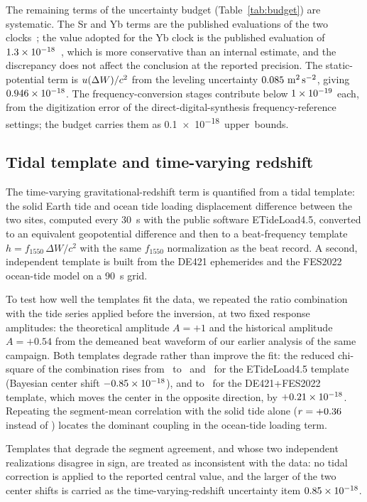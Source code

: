 The remaining terms of the uncertainty budget (Table~\ref{tab:budget})
are systematic. The Sr and Yb terms are the published evaluations of
the two clocks~\citep{jia2026sr, zhu2026yb}; the value adopted for the
Yb clock is the published evaluation of
$1.3\times10^{-18}$~\citep{zhu2026yb}, which is more conservative
than an internal estimate, and the discrepancy does not affect the
conclusion at the reported precision. The static-potential term is
$u(\Delta W)/c^2$ from the leveling uncertainty
$0.085~\mathrm{m^2\,s^{-2}}$, giving
$0.946 \times 10^{-18}$. The frequency-conversion stages
contribute below $1\times10^{-19}$ each, from the digitization error
of the direct-digital-synthesis frequency-reference settings; the
budget carries them as \qty{0.1e-18} upper bounds.

\subsection*{Tidal template and time-varying redshift}

The time-varying gravitational-redshift term is quantified from a
tidal template: the solid Earth tide and ocean tide loading
displacement difference between the two sites, computed every
\qty{30}{s} with the public software ETideLoad4.5, converted to an
equivalent geopotential difference and then to a beat-frequency
template $h = f_{1550}\,\Delta W/c^2$ with the same $f_{1550}$
normalization as the beat record. A second, independent template is
built from the DE421 ephemerides and the FES2022 ocean-tide model on
a \qty{90}{s} grid.

To test how well the templates fit the data, we repeated the ratio
combination with the tide series applied before the inversion, at two
fixed response amplitudes: the theoretical amplitude $A = +1$ and the
historical amplitude $A = +0.54$ from the demeaned beat waveform of
our earlier analysis of the same campaign. Both templates degrade
rather than improve the fit: the reduced chi-square of the
combination rises from \tidalChiRaw~to \tidalChiTheory~and
\tidalChiEmp~for the ETideLoad4.5 template (Bayesian center shift
$-0.85\times10^{-18}$), and to \tidalChiAlt~for the
DE421+FES2022 template, which moves the center in the opposite
direction, by $+0.21\times10^{-18}$. Repeating the
segment-mean correlation with the solid tide alone
($r = +0.36$ instead of \tidalCorrTotal) locates the
dominant coupling in the ocean-tide loading term.

Templates that degrade the segment agreement, and whose two
independent realizations disagree in sign, are treated as
inconsistent with the data: no tidal correction is applied to the
reported central value, and the larger of the two center shifts is
carried as the time-varying-redshift uncertainty item
$0.85\times10^{-18}$.

